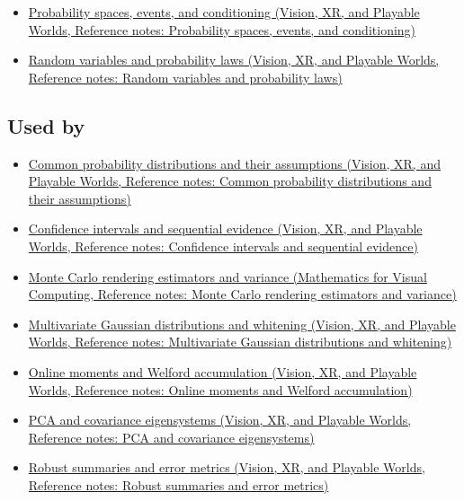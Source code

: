 \begin{itemize}
\tightlist
\item
  \href{../07-Vision-XR-and-Playable-Worlds/main.pdf\#nameddest=appendix-f1ef323f6ed7}{Probability spaces, events, and conditioning (Vision, XR, and Playable Worlds, Reference notes: Probability spaces, events, and conditioning)}
\item
  \href{../07-Vision-XR-and-Playable-Worlds/main.pdf\#nameddest=appendix-4d0203f7944f}{Random variables and probability laws (Vision, XR, and Playable Worlds, Reference notes: Random variables and probability laws)}
\end{itemize}

\subsection{Used by}\label{appendix-54c383df9992-used-by}

\hypertarget{appendix-54c383df9992-used-by}{}

\begin{itemize}
\tightlist
\item
  \href{../07-Vision-XR-and-Playable-Worlds/main.pdf\#nameddest=appendix-a2360b435383}{Common probability distributions and their assumptions (Vision, XR, and Playable Worlds, Reference notes: Common probability distributions and their assumptions)}
\item
  \href{../07-Vision-XR-and-Playable-Worlds/main.pdf\#nameddest=appendix-c83016554b1e}{Confidence intervals and sequential evidence (Vision, XR, and Playable Worlds, Reference notes: Confidence intervals and sequential evidence)}
\item
  \href{../02-Mathematics-for-Visual-Computing/main.pdf\#nameddest=appendix-031e02bf28af}{Monte Carlo rendering estimators and variance (Mathematics for Visual Computing, Reference notes: Monte Carlo rendering estimators and variance)}
\item
  \href{../07-Vision-XR-and-Playable-Worlds/main.pdf\#nameddest=appendix-12bbe185dbe5}{Multivariate Gaussian distributions and whitening (Vision, XR, and Playable Worlds, Reference notes: Multivariate Gaussian distributions and whitening)}
\item
  \href{../07-Vision-XR-and-Playable-Worlds/main.pdf\#nameddest=appendix-33237f0f618b}{Online moments and Welford accumulation (Vision, XR, and Playable Worlds, Reference notes: Online moments and Welford accumulation)}
\item
  \href{../07-Vision-XR-and-Playable-Worlds/main.pdf\#nameddest=appendix-ad175ef3c5bf}{PCA and covariance eigensystems (Vision, XR, and Playable Worlds, Reference notes: PCA and covariance eigensystems)}
\item
  \href{../07-Vision-XR-and-Playable-Worlds/main.pdf\#nameddest=appendix-bcc44e9d3d02}{Robust summaries and error metrics (Vision, XR, and Playable Worlds, Reference notes: Robust summaries and error metrics)}
\end{itemize}

